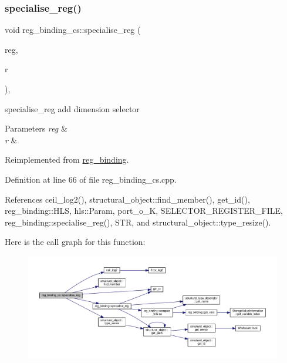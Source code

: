 \subsubsection{\texorpdfstring{specialise\+\_\+reg()}{specialise\_reg()}}
{\footnotesize\ttfamily void reg\+\_\+binding\+\_\+cs\+::specialise\+\_\+reg (\begin{DoxyParamCaption}\item[{\hyperlink{structural__objects_8hpp_a8ea5f8cc50ab8f4c31e2751074ff60b2}{structural\+\_\+object\+Ref} \&}]{reg,  }\item[{unsigned int}]{r }\end{DoxyParamCaption})\hspace{0.3cm}{\ttfamily [protected]}, {\ttfamily [virtual]}}



specialise\+\_\+reg add dimension selector 


\begin{DoxyParams}{Parameters}
{\em reg} & \\
\hline
{\em r} & \\
\hline
\end{DoxyParams}


Reimplemented from \hyperlink{classreg__binding_a3b84d34513f28b85ddbd578b2d0ce191}{reg\+\_\+binding}.



Definition at line 66 of file reg\+\_\+binding\+\_\+cs.\+cpp.



References ceil\+\_\+log2(), structural\+\_\+object\+::find\+\_\+member(), get\+\_\+id(), reg\+\_\+binding\+::\+H\+LS, hls\+::\+Param, port\+\_\+o\+\_\+K, S\+E\+L\+E\+C\+T\+O\+R\+\_\+\+R\+E\+G\+I\+S\+T\+E\+R\+\_\+\+F\+I\+LE, reg\+\_\+binding\+::specialise\+\_\+reg(), S\+TR, and structural\+\_\+object\+::type\+\_\+resize().

Here is the call graph for this function\+:
\nopagebreak
\begin{figure}[H]
\begin{center}
\leavevmode
\includegraphics[width=350pt]{da/ddf/classreg__binding__cs_acb0a006d620a6320239cc3973cf2198c_cgraph}
\end{center}
\end{figure}


